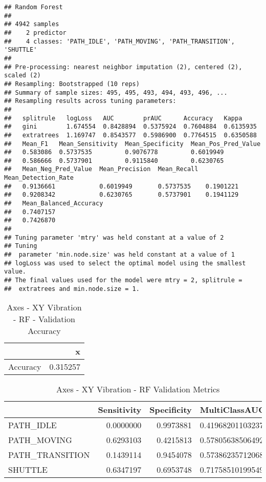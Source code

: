 \documentclass[]{article}
\begin{document}
\begin{verbatim}
## Random Forest 
## 
## 4942 samples
##    2 predictor
##    4 classes: 'PATH_IDLE', 'PATH_MOVING', 'PATH_TRANSITION', 'SHUTTLE' 
## 
## Pre-processing: nearest neighbor imputation (2), centered (2), scaled (2) 
## Resampling: Bootstrapped (10 reps) 
## Summary of sample sizes: 495, 495, 493, 494, 493, 496, ... 
## Resampling results across tuning parameters:
## 
##   splitrule   logLoss   AUC        prAUC      Accuracy   Kappa    
##   gini        1.674554  0.8428894  0.5375924  0.7604884  0.6135935
##   extratrees  1.169747  0.8543577  0.5986900  0.7764515  0.6350588
##   Mean_F1   Mean_Sensitivity  Mean_Specificity  Mean_Pos_Pred_Value
##   0.583086  0.5737535         0.9076778         0.6019949          
##   0.586666  0.5737901         0.9115840         0.6230765          
##   Mean_Neg_Pred_Value  Mean_Precision  Mean_Recall  Mean_Detection_Rate
##   0.9136661            0.6019949       0.5737535    0.1901221          
##   0.9208342            0.6230765       0.5737901    0.1941129          
##   Mean_Balanced_Accuracy
##   0.7407157             
##   0.7426870             
## 
## Tuning parameter 'mtry' was held constant at a value of 2
## Tuning
##  parameter 'min.node.size' was held constant at a value of 1
## logLoss was used to select the optimal model using the smallest value.
## The final values used for the model were mtry = 2, splitrule =
##  extratrees and min.node.size = 1.
\end{verbatim}

\begin{table}[!h]

\caption{\label{tab:sensor-xy-vib-rf-results}Axes - XY Vibration - RF - Validation Accuracy}
\centering
\begin{tabular}[t]{lr}
\toprule
  & x\\
\midrule
Accuracy & 0.315257\\
\bottomrule
\end{tabular}
\end{table}

\begin{table}[!h]

\caption{\label{tab:sensor-xy-vib-rf-results}Axes - XY Vibration - RF Validation Metrics}
\centering
\begin{tabular}[t]{lrrl}
\toprule
  & Sensitivity & Specificity & MultiClassAUC\\
\midrule
PATH\_IDLE & 0.0000000 & 0.9973881 & 0.419682011032371\\
PATH\_MOVING & 0.6293103 & 0.4215813 & 0.578056385064921\\
PATH\_TRANSITION & 0.1439114 & 0.9454078 & 0.573862357120681\\
SHUTTLE & 0.6347197 & 0.6953748 & 0.717585101995496\\
\bottomrule
\end{tabular}
\end{table}
\end{document}
